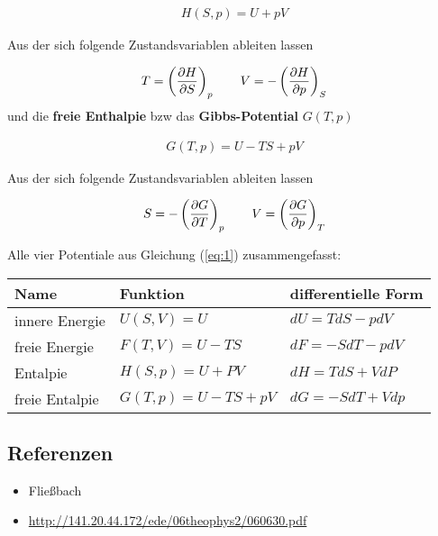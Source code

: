 \begin{align}
  \label{eq:10}
  H(S,p) = U + pV
\end{align}

Aus der sich folgende Zustandsvariablen ableiten lassen

\begin{align}
  \label{eq:11}
  T= \left(\pdiff H_S \right)_p  \qquad V = - \left(\pdiff H_p \right)_S 
\end{align}
und die \textbf{freie Enthalpie} bzw das \textbf{Gibbs-Potential} \(G(T,p)\)

\begin{align}
  \label{eq:12}
  G(T,p) = U - TS + pV
\end{align}

Aus der sich folgende Zustandsvariablen ableiten lassen

\begin{align}
  \label{eq:13}
  S= -\left(\pdiff G_T \right)_p  \qquad V =  \left(\pdiff G_p \right)_T
\end{align}

Alle vier Potentiale aus Gleichung (\ref{eq:1}) zusammengefasst:


\begin{table}[h]
  \centering
  \begin{tabular}{lll}
    Name&Funktion&differentielle Form\\
\hline
innere Energie&\(U(S,V)=U\)&\(dU = TdS-pdV\)\\
freie Energie&\(F(T,V)=U-TS\)&\(dF=-SdT-pdV\)\\
Entalpie & \(H(S,p)=U+PV\)&\(dH = TdS+VdP\)\\
freie Entalpie & \(G(T,p)=U-TS+pV\)&\(dG = -SdT+Vdp\)
  \end{tabular}
\end{table}


\subsection*{Referenzen}
\begin{itemize}
\item Fließbach
\item \url{http://141.20.44.172/ede/06theophys2/060630.pdf}
\end{itemize}


